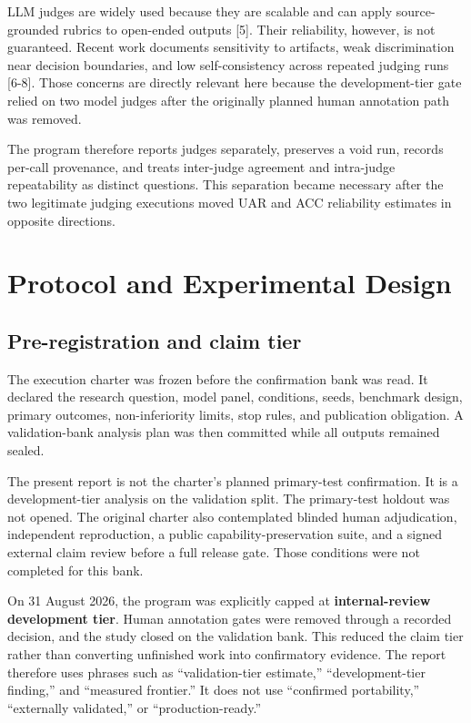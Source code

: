 \documentclass[9pt,letterpaper,twocolumn]{extarticle}
\begin{document}
LLM judges are widely used because they are scalable and can apply
source-grounded rubrics to open-ended outputs {[}5{]}. Their
reliability, however, is not guaranteed. Recent work documents
sensitivity to artifacts, weak discrimination near decision boundaries,
and low self-consistency across repeated judging runs {[}6-8{]}. Those
concerns are directly relevant here because the development-tier gate
relied on two model judges after the originally planned human annotation
path was removed.

The program therefore reports judges separately, preserves a void run,
records per-call provenance, and treats inter-judge agreement and
intra-judge repeatability as distinct questions. This separation became
necessary after the two legitimate judging executions moved UAR and ACC
reliability estimates in opposite directions.

\section{Protocol and Experimental
Design}\label{protocol-and-experimental-design}

\subsection{Pre-registration and claim
tier}\label{pre-registration-and-claim-tier}

The execution charter was frozen before the confirmation bank was read.
It declared the research question, model panel, conditions, seeds,
benchmark design, primary outcomes, non-inferiority limits, stop rules,
and publication obligation. A validation-bank analysis plan was then
committed while all outputs remained sealed.

The present report is not the charter's planned primary-test
confirmation. It is a development-tier analysis on the validation split.
The primary-test holdout was not opened. The original charter also
contemplated blinded human adjudication, independent reproduction, a
public capability-preservation suite, and a signed external claim review
before a full release gate. Those conditions were not completed for this
bank.

On 31 August 2026, the program was explicitly capped at
\textbf{internal-review development tier}. Human annotation gates were
removed through a recorded decision, and the study closed on the
validation bank. This reduced the claim tier rather than converting
unfinished work into confirmatory evidence. The report therefore uses
phrases such as ``validation-tier estimate,'' ``development-tier
finding,'' and ``measured frontier.'' It does not use ``confirmed
portability,'' ``externally validated,'' or ``production-ready.''
\end{document}
